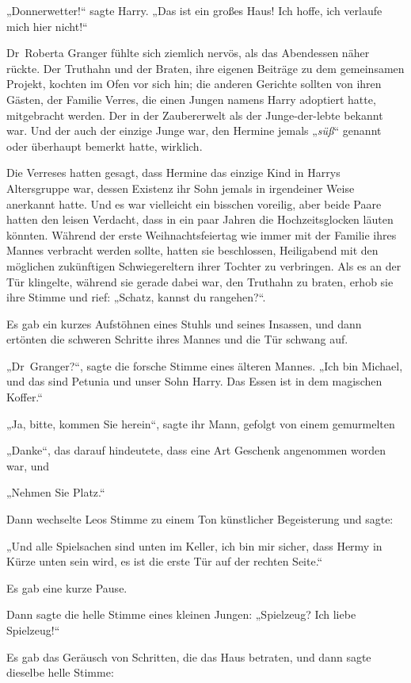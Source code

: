 {„Donnerwetter!“ sagte Harry. „Das ist ein großes Haus! Ich hoffe, ich verlaufe mich hier nicht!“

Dr~Roberta Granger fühlte sich ziemlich nervös, als das Abendessen näher rückte. Der Truthahn und der Braten, ihre eigenen Beiträge zu dem gemeinsamen Projekt, kochten im Ofen vor sich hin; die anderen Gerichte sollten von ihren Gästen, der Familie Verres, die einen Jungen namens Harry adoptiert hatte, mitgebracht werden. Der in der Zaubererwelt als der Junge-der-lebte bekannt war. Und der auch der einzige Junge war, den Hermine jemals „\emph{süß}“ genannt oder überhaupt bemerkt hatte, wirklich.

Die Verreses hatten gesagt, dass Hermine das einzige Kind in Harrys Altersgruppe war, dessen Existenz ihr Sohn jemals in irgendeiner Weise anerkannt hatte. Und es war vielleicht ein bisschen voreilig, aber beide Paare hatten den leisen Verdacht, dass in ein paar Jahren die Hochzeitsglocken läuten könnten. Während der erste Weihnachtsfeiertag wie immer mit der Familie ihres Mannes verbracht werden sollte, hatten sie beschlossen, Heiligabend mit den möglichen zukünftigen Schwiegereltern ihrer Tochter zu verbringen. Als es an der Tür klingelte, während sie gerade dabei war, den Truthahn zu braten, erhob sie ihre Stimme und rief: „Schatz, kannst du rangehen?“.

Es gab ein kurzes Aufstöhnen eines Stuhls und seines Insassen, und dann ertönten die schweren Schritte ihres Mannes und die Tür schwang auf.

„Dr~Granger?“, sagte die forsche Stimme eines älteren Mannes. „Ich bin Michael, und das sind Petunia und unser Sohn Harry. Das Essen ist in dem magischen Koffer.“

„Ja, bitte, kommen Sie herein“, sagte ihr Mann, gefolgt von einem gemurmelten

„Danke“, das darauf hindeutete, dass eine Art Geschenk angenommen worden war, und

„Nehmen Sie Platz.“

Dann wechselte Leos Stimme zu einem Ton künstlicher Begeisterung und sagte:

„Und alle Spielsachen sind unten im Keller, ich bin mir sicher, dass Hermy in Kürze unten sein wird, es ist die erste Tür auf der rechten Seite.“

Es gab eine kurze Pause.

Dann sagte die helle Stimme eines kleinen Jungen: „Spielzeug? Ich liebe Spielzeug!“

Es gab das Geräusch von Schritten, die das Haus betraten, und dann sagte dieselbe helle Stimme:

}
